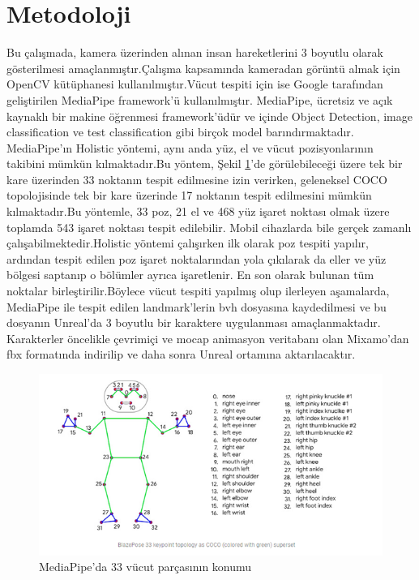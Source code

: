 \documentclass[12pt, a4paper]{article}
\begin{document}
\newpage
\section{Metodoloji}
Bu çalışmada, kamera üzerinden alınan insan hareketlerini 3 boyutlu olarak gösterilmesi amaçlanmıştır.Çalışma kapsamında kameradan görüntü almak için OpenCV kütüphanesi kullanılmıştır.Vücut tespiti için ise Google tarafından geliştirilen MediaPipe framework'ü kullanılmıştır. MediaPipe, ücretsiz ve açık kaynaklı bir makine öğrenmesi framework'üdür ve içinde Object Detection, image classification ve test classification gibi birçok model barındırmaktadır.\\MediaPipe'ın Holistic yöntemi, aynı anda yüz, el ve vücut pozisyonlarının  takibini mümkün kılmaktadır.Bu yöntem, Şekil \ref{fig:mesh1}'de görülebileceği üzere tek bir kare üzerinden 33 noktanın tespit edilmesine izin verirken, geleneksel COCO topolojisinde tek bir kare üzerinde 17 noktanın tespit edilmesini mümkün kılmaktadır.Bu yöntemle, 33 poz, 21 el ve 468 yüz işaret noktası olmak üzere toplamda 543 işaret noktası tespit edilebilir. Mobil cihazlarda bile gerçek zamanlı çalışabilmektedir.Holistic yöntemi çalışırken ilk olarak poz tespiti yapılır, ardından tespit edilen poz işaret noktalarından yola çıkılarak da eller ve yüz bölgesi saptanıp o bölümler ayrıca işaretlenir. En son olarak bulunan tüm noktalar birleştirilir.Böylece vücut tespiti yapılmış olup ilerleyen aşamalarda, MediaPipe ile tespit edilen landmark'lerin bvh dosyasına kaydedilmesi ve bu dosyanın Unreal'da 3 boyutlu bir karaktere uygulanması amaçlanmaktadır. Karakterler öncelikle  çevrimiçi ve mocap animasyon veritabanı olan  Mixamo'dan fbx formatında indirilip ve daha sonra Unreal ortamına aktarılacaktır.



\begin{figure}[h]
	\centering
	\includegraphics[width=1.0\textwidth]{pose_landmarks.png}
	\caption{MediaPipe'da 33 vücut parçasının konumu}
	\label{fig:mesh1}
\end{figure}
\end{document}
